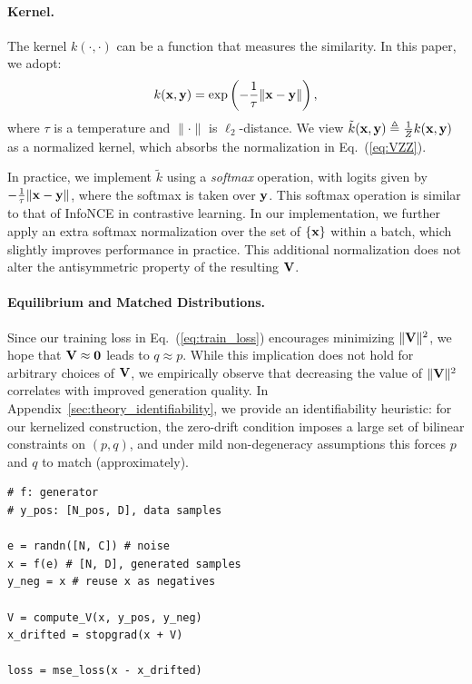 \paragraph{Kernel.}
The kernel $k(\cdot, \cdot)$ can be a function that measures the similarity. In this paper, we adopt:
\begin{equation}
\label{eq:kernel}
k(\mathbf{x}, \mathbf{y}) = \exp\left(-\frac{1}{\tau} \|\mathbf{x} - \mathbf{y}\|\right),
\end{equation}
where $\tau$ is a temperature and $\|\cdot\|$ is $\ell_2$-distance. We view $\tilde{k}(\mathbf{x}, \mathbf{y}) \triangleq\frac{1}{Z}k(\mathbf{x}, \mathbf{y})$ as a normalized kernel, which absorbs the normalization in Eq.~(\ref{eq:VZZ}).

In practice, we implement $\tilde{k}$ using a \textit{softmax} operation, with logits given by $-\frac{1}{\tau} \|\mathbf{x} - \mathbf{y}\|$, where the softmax is taken over $\mathbf{y}$.
This softmax operation is similar to that of InfoNCE \cite{oord2018representation} in contrastive learning.
In our implementation, we further apply an extra softmax normalization over the set of $\{\mathbf{x}\}$ within a batch, which slightly improves performance in practice. This additional normalization does not alter the antisymmetric property of the resulting $\mathbf{V}$.

\paragraph{Equilibrium and Matched Distributions.}
Since our training loss in Eq.~(\ref{eq:train_loss}) encourages minimizing $\|\mathbf{V}\|^2$, we hope that $\mathbf{V} \approx \textbf{0}$ leads to $q\approx p$.
While this implication does not hold for arbitrary choices of $\mathbf{V}$, we empirically observe that decreasing the value of $\|\mathbf{V}\|^2$ correlates with improved generation quality. In Appendix~\ref{sec:theory_identifiability}, we provide an identifiability heuristic: for our kernelized construction, the zero-drift condition imposes a large set of bilinear constraints on $(p,q)$, and under mild non-degeneracy assumptions this forces $p$ and $q$ to match (approximately).


% 

\begin{algorithm}[t]
\caption{
\textbf{Training Loss.} Note: for brevity, here the negative samples $\texttt{y\_neg}$ are from the same batch of generated data, though they can include other source of negatives.
}
\label{alg:training_code}
\begin{lstlisting}
# f: generator
# y_pos: [N_pos, D], data samples

e = randn([N, C]) # noise
x = f(e) # [N, D], generated samples
y_neg = x # reuse x as negatives

V = compute_V(x, y_pos, y_neg)
x_drifted = stopgrad(x + V)

loss = mse_loss(x - x_drifted)
\end{lstlisting}
\end{algorithm}


